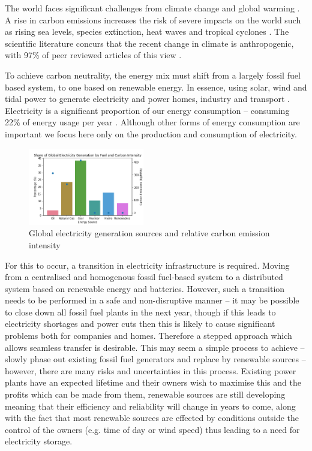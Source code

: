 
The world faces significant challenges from climate change and global warming \cite{Masson-Delmotte2018}. A rise in carbon emissions increases the risk of severe impacts on the world such as rising sea levels, species extinction, heat waves and tropical cyclones \cite{IPCC2014}. The scientific literature concurs that the recent change in climate is anthropogenic, with 97\% of peer reviewed articles of this view \cite{Cook2013}.  

To achieve carbon neutrality, the energy mix must shift from a largely fossil fuel based system, to one based on renewable energy. In essence, using solar, wind and tidal power to generate electricity and power homes, industry and transport \cite{Hoffert2002}. Electricity is a significant proportion of our energy consumption -- consuming 22\% of energy usage per year \cite{Lakshmi2017}. Although other forms of energy consumption are important we focus here only on the production and consumption of electricity. 


\begin{figure}[h]
	\begin{center}
		\includegraphics[width=0.45\textwidth]{figures/elec_gen_carbon.png}
		\caption{Global electricity generation sources and relative carbon emission intensity ~\cite{BP2018,Hall1983}}
		\label{fig:fuel_emissions_market_share}
	\end{center}
\end{figure}


For this to occur, a transition in electricity infrastructure is required. Moving from a centralised and homogenous fossil fuel-based system to a distributed system based on renewable energy and batteries. However, such a transition needs to be performed in a safe and non-disruptive manner -- it may be possible to close down all fossil fuel plants in the next year, though if this leads to electricity shortages and power cuts then this is likely to cause significant problems both for companies and homes. Therefore a stepped approach which allows seamless transfer is desirable. This may seem a simple process to achieve -- slowly phase out existing fossil fuel generators and replace by renewable sources -- however, there are many risks and uncertainties in this process. Existing power plants have an expected lifetime and their owners wish to maximise this and the profits which can be made from them, renewable sources are still developing meaning that their efficiency and reliability will change in years to come, along with the fact that most renewable sources are effected by conditions outside the control of the owners (e.g. time of day or wind speed) thus leading to a need for electricity storage. 

